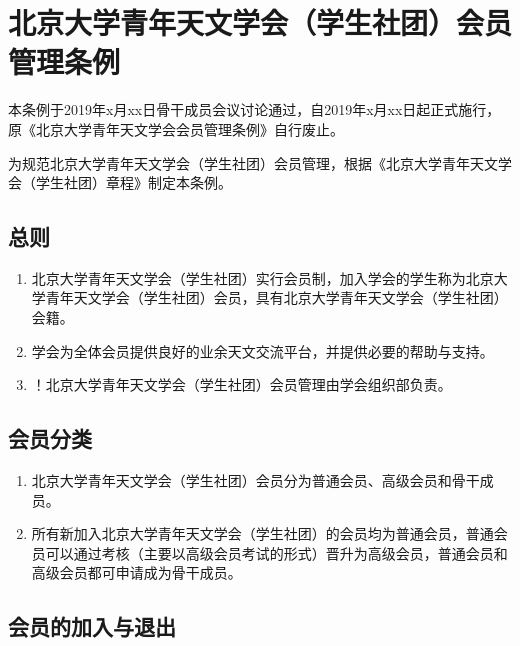 \chapter{北京大学青年天文学会（学生社团）会员管理条例}

本条例于2019年x月xx日骨干成员会议讨论通过，自2019年x月xx日起正式施行，原《北京大学青年天文学会会员管理条例》自行废止。

为规范北京大学青年天文学会（学生社团）会员管理，根据《北京大学青年天文学会（学生社团）章程》制定本条例。

\section{总则}

\begin{enumerate}
    \item 北京大学青年天文学会（学生社团）实行会员制，加入学会的学生称为北京大学青年天文学会（学生社团）会员，具有北京大学青年天文学会（学生社团）会籍。
    
    \item 学会为全体会员提供良好的业余天文交流平台，并提供必要的帮助与支持。
    
    \item ！北京大学青年天文学会（学生社团）会员管理由学会组织部负责。
\end{enumerate}

\section{会员分类}

\begin{enumerate}[resume]
    \item 北京大学青年天文学会（学生社团）会员分为普通会员、高级会员和骨干成员。
    
    \item 所有新加入北京大学青年天文学会（学生社团）的会员均为普通会员，普通会员可以通过考核（主要以高级会员考试的形式）晋升为高级会员，普通会员和高级会员都可申请成为骨干成员。
\end{enumerate}

\section{会员的加入与退出}

